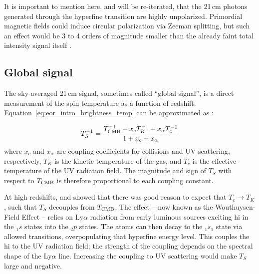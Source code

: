 It is important to mention here, and will be re-iterated, that the 21\,cm photons generated through the hyperfine transition are highly unpolarized. Primordial magnetic fields could induce circular polarization via Zeeman splitting, but such an effect would be 3 to 4 orders of magnitude smaller than the already faint total intensity signal itself \citep[e.g.][also see Chapter~\ref{chapter:astro_rad}]{Babich.05}.



\subsection{Global signal}

The sky-averaged 21\,cm signal, sometimes called ``global signal'', is a direct measurement of the spin temperature as a function of redshift. Equation~\ref{eq:eor_intro_brightness_temp} can be approximated as \citep{Field.56}:

\begin{equation}
T_S^{-1} = \frac{T_{\rm CMB}^{-1} + x_cT_K^{-1} + x_{\alpha}T_c^{-1} }{1 + x_c + x_{\alpha}}
\end{equation}
where $x_c$ and $x_{\alpha}$ are coupling coefficients for collisions and UV scattering, respectively, $T_K$ is the kinetic temperature of the gas, and $T_c$ is the effective temperature of the UV radiation field. The magnitude and sign of $T_S$ with respect to $T_{\rm CMB}$ is therefore proportional to each coupling constant.

At high redshifts, \cite{Wouthuysen.52} and \cite{Field.59} showed that there was good reason to expect that $T_c \rightarrow T_K$, such that $T_S$ decouples from $T_{\rm CMB}$. The effect -- now known as the Wouthuysen-Field Effect -- relies on Ly$\alpha$ radiation from early luminous sources exciting {\sc hi} in the ${}_1s$ states into the ${}_2p$ states. The atoms can then decay to the  ${}_1s_1$ state via allowed transitions, overpopulating that hyperfine energy level. This couples the {\sc hi} to the UV radiation field; the strength of the coupling depends on the spectral shape of the Ly$\alpha$ line. Increasing the coupling to UV scattering would make $T_S$ large and negative.

